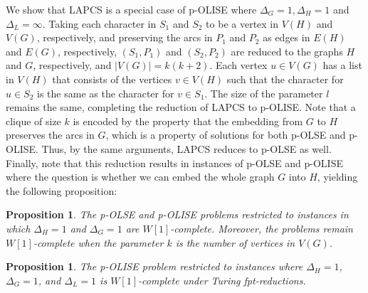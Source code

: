 \documentclass[11pt]{article}
\newtheorem{proposition}[theorem]{Proposition}
\begin{document}
We show that LAPCS is a special case of p-OLISE where $\Delta_G=1, \Delta_H=1$ and $\Delta_L=\infty$.  Taking each character in $S_1$ and $S_2$ to be a vertex in $V(H)$ and $V(G)$, respectively, and preserving the arcs in $P_1$ and $P_2$ as edges in $E(H)$ and $E(G)$, respectively, $(S_1, P_1)$ and $(S_2, P_2)$ are reduced to the graphs $H$ and $G$, respectively, and $|V(G)| = k(k+2)$. Each vertex $u \in V(G)$ has a list in $V(H)$ that consists of the vertices $v \in V(H)$ such that the character for $u \in S_2$ is the same as the character for $v \in S_1$.  The size of the parameter $l$ remains the same, completing the reduction of LAPCS to p-OLISE.  Note that a clique of size $k$ is encoded by the property that the embedding from $G$ to $H$ preserves the arcs in $G$, which is a property of solutions for both p-OLSE and p-OLISE.  Thus, by the same arguments, LAPCS reduces to p-OLSE as well.  Finally, note that this reduction results in instances of p-OLSE and p-OLISE where the question is whether we can embed the whole graph $G$ into $H$, yielding the following proposition:

\begin{proposition}\label{prop:whardness}
The p-OLSE and p-OLISE problems restricted to instances in which $\Delta_H = 1$ and $\Delta_G = 1$ are $W[1]$-complete.  Moreover, the problems remain $W[1]$-complete when the parameter $k$ is the number of vertices in $V(G)$.
\end{proposition}

\begin{proposition}\label{prop:whardness2}
The p-OLISE problem restricted to instances where $\Delta_H = 1$, $\Delta_G = 1$, and $\Delta_L = 1$ is $W[1]$-complete under Turing fpt-reductions.
\end{proposition}
\end{document}
